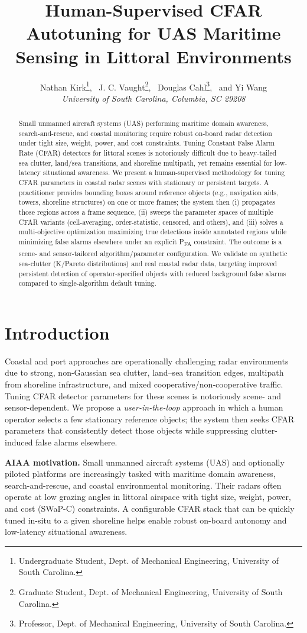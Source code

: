 \documentclass[10pt,letterpaper]{article}
\title{\LARGE\bfseries Human-Supervised CFAR Autotuning for UAS Maritime Sensing in Littoral Environments}
\author{
Nathan Kirk\footnote{Undergraduate Student, Dept. of Mechanical Engineering, University of South Carolina.}, \
J. C. Vaught\footnote{Graduate Student, Dept. of Mechanical Engineering, University of South Carolina.}, \
Douglas Cahl\footnote{Professor, Dept. of Mechanical Engineering, University of South Carolina.}, \
and Yi Wang\footnotemark[3]\\[6pt]
\textit{University of South Carolina, Columbia, SC 29208}
}
\date{}
\begin{document}
\maketitle

\begin{abstract}
Small unmanned aircraft systems (UAS) performing maritime domain awareness, search-and-rescue, and coastal monitoring require robust on-board radar detection under tight size, weight, power, and cost constraints. Tuning Constant False Alarm Rate (CFAR) detectors for littoral scenes is notoriously difficult due to heavy-tailed sea clutter, land/sea transitions, and shoreline multipath, yet remains essential for low-latency situational awareness. We present a human-supervised methodology for tuning CFAR parameters in coastal radar scenes with stationary or persistent targets. A practitioner provides bounding boxes around reference objects (e.g., navigation aids, towers, shoreline structures) on one or more frames; the system then (i) propagates those regions across a frame sequence, (ii) sweeps the parameter spaces of multiple CFAR variants (cell-averaging, order-statistic, censored, and others), and (iii) solves a multi-objective optimization maximizing true detections inside annotated regions while minimizing false alarms elsewhere under an explicit P\textsubscript{FA} constraint. The outcome is a scene- and sensor-tailored algorithm/parameter configuration. We validate on synthetic sea-clutter (K/Pareto distributions) and real coastal radar data, targeting improved persistent detection of operator-specified objects with reduced background false alarms compared to single-algorithm default tuning.
\end{abstract}

\section{Introduction}
Coastal and port approaches are operationally challenging radar environments due to strong, non-Gaussian sea clutter, land--sea transition edges, multipath from shoreline infrastructure, and mixed cooperative/non-cooperative traffic. Tuning CFAR detector parameters for these scenes is notoriously scene- and sensor-dependent. We propose a \emph{user-in-the-loop} approach in which a human operator selects a few stationary reference objects; the system then seeks CFAR parameters that consistently detect those objects while suppressing clutter-induced false alarms elsewhere.

\textbf{AIAA motivation.} Small unmanned aircraft systems (UAS) and optionally piloted platforms are increasingly tasked with maritime domain awareness, search-and-rescue, and coastal environmental monitoring. Their radars often operate at low grazing angles in littoral airspace with tight size, weight, power, and cost (SWaP-C) constraints. A configurable CFAR stack that can be quickly tuned in-situ to a given shoreline helps enable robust on-board autonomy and low-latency situational awareness.
\end{document}
